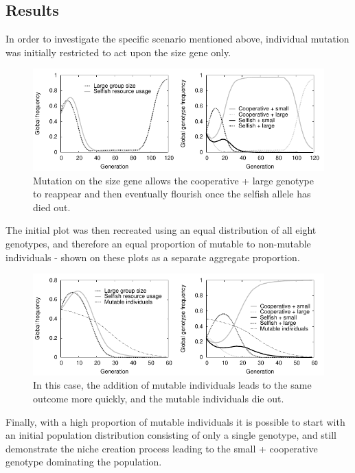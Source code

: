 \documentclass[11pt]{article}
\begin{document}
\subsection{Results}
In order to investigate the specific scenario mentioned above, individual mutation was initially restricted to act upon the size gene only.
\vspace{-.5cm}
\begin{figure}[!ht]
  \centering
  \includegraphics{sizeplot.pdf}
  \caption{Mutation on the size gene allows the cooperative + large genotype to reappear and then eventually flourish once the selfish allele has died out.}
  \label{fig:sizeplot}
\end{figure}

The initial plot was then recreated using an equal distribution of all eight genotypes, and therefore an equal proportion of mutable to non-mutable individuals - shown on these plots as a separate aggregate proportion.
\vspace{-.5cm}

\begin{figure}[!ht]
  \centering
  \includegraphics{60geneqmutfix.pdf}
  \caption{In this case, the addition of mutable individuals leads to the same outcome more quickly, and the mutable individuals die out.}
  \label{fig:60geneqmutfix}
\end{figure}

Finally, with a high proportion of mutable individuals it is possible to start with an initial population distribution consisting of only a single genotype, and still demonstrate the niche creation process leading to the small + cooperative genotype dominating the population.
\vspace{-.5cm}
\end{document}
